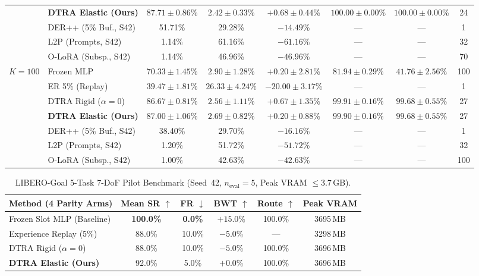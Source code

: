 \documentclass[10pt]{article}
\begin{document}
\begin{table}[ht!]
\begin{tabular}{llcccccc}
     & \textbf{DTRA Elastic (Ours)} & $\mathbf{87.71 \pm 0.86}$\% & $2.42 \pm 0.33$\% & $+0.68 \pm 0.44$\% & $\mathbf{100.00 \pm 0.00}$\% & $\mathbf{100.00 \pm 0.00}$\% & 24 \\
    & DER++ (5\% Buf., S42) & 51.71\% & 29.28\% & $-14.49$\% & --- & --- & 1 \\
    & L2P (Prompts, S42) & 1.14\% & 61.16\% & $-61.16$\% & --- & --- & 32 \\
    & O-LoRA (Subsp., S42) & 1.14\% & 46.96\% & $-46.96$\% & --- & --- & 70 \\
    \midrule
    $K=100$ & Frozen MLP & $70.33 \pm 1.45$\% & $2.90 \pm 1.28$\% & $+0.20 \pm 2.81$\% & $81.94 \pm 0.29$\% & $41.76 \pm 2.56$\% & 100 \\
     & ER 5\% (Replay) & $39.47 \pm 1.81$\% & $26.33 \pm 4.24$\% & $-20.00 \pm 3.17$\% & --- & --- & 1 \\
     & DTRA Rigid ($\alpha=0$) & $86.67 \pm 0.81$\% & $2.56 \pm 1.11$\% & $+0.67 \pm 1.35$\% & $\mathbf{99.91 \pm 0.16}$\% & $\mathbf{99.68 \pm 0.55}$\% & 27 \\
     & \textbf{DTRA Elastic (Ours)} & $\mathbf{87.00 \pm 1.06}$\% & $2.69 \pm 0.82$\% & $+0.20 \pm 0.88$\% & $99.90 \pm 0.16$\% & $\mathbf{99.68 \pm 0.55}$\% & 27 \\
    & DER++ (5\% Buf., S42) & 38.40\% & 29.70\% & $-16.16$\% & --- & --- & 1 \\
    & L2P (Prompts, S42) & 1.20\% & 51.72\% & $-51.72$\% & --- & --- & 32 \\
    & O-LoRA (Subsp., S42) & 1.00\% & 42.63\% & $-42.63$\% & --- & --- & 100 \\
    \bottomrule
  \end{tabular}
\end{table}



\begin{table}[ht!]
  \centering
  \caption{LIBERO-Goal 5-Task 7-DoF Pilot Benchmark (Seed~42, $n_{\text{eval}}=5$, Peak VRAM $\le 3.7$\,GB).}
  \label{tab:libero_goal_pilot}
  \small
  \setlength{\tabcolsep}{5pt}
  \begin{tabular}{lccccc}
    \toprule
    \textbf{Method (4 Parity Arms)} & \textbf{Mean SR $\uparrow$} & \textbf{FR $\downarrow$} & \textbf{BWT $\uparrow$} & \textbf{Route $\uparrow$} & \textbf{Peak VRAM} \\
    \midrule
    Frozen Slot MLP (Baseline) & \textbf{100.0\%} & \textbf{0.0\%} & $\mathbf{+15.0}$\% & 100.0\% & 3695\,MB \\
    Experience Replay (5\%) & 88.0\% & 10.0\% & $-5.0$\% & --- & 3298\,MB \\
    DTRA Rigid ($\alpha=0$) & 88.0\% & 10.0\% & $-5.0$\% & 100.0\% & 3696\,MB \\
    \textbf{DTRA Elastic (Ours)} & 92.0\% & 5.0\% & $+0.0$\% & 100.0\% & 3696\,MB \\
    \bottomrule
  \end{tabular}
\end{table}
\end{document}
